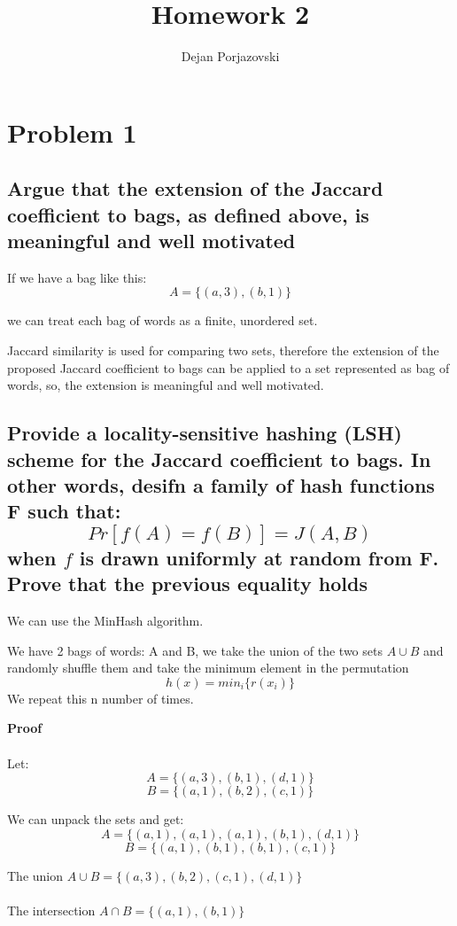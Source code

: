 \documentclass[11pt]{article}
\begin{document}
\title{\textbf{Homework 2}}
\author{Dejan Porjazovski}
\maketitle

\section{Problem 1}
\subsection{Argue that the extension of the Jaccard coefficient to bags, as defined above, is meaningful and well motivated}

If we have a bag like this:
$$ A = \{ (a,3), (b,1) \} $$

we can treat each bag of words as a finite, unordered set.

Jaccard similarity is used for comparing two sets, therefore the extension of the proposed Jaccard coefficient to bags can be applied to a set represented as bag of words, so, the extension is meaningful and well motivated.


\subsection{Provide a locality-sensitive hashing (LSH) scheme for the Jaccard coefficient to bags. In other words, desifn a family of hash functions F such that: $$ Pr[f(A) = f(B)] = J(A, B) $$
when $ f $ is drawn uniformly at random from F.
Prove that the previous equality holds
}

We can use the MinHash algorithm.

We have 2 bags of words: A and B, we take the union of the two sets $ A\cup B $ and randomly shuffle them and take the minimum element in the permutation
$$ h(x) = min_i\{ r(x_i) \} $$
We repeat this n number of times.

\textbf{Proof}
\\~\\
Let:
$$ A = \{ (a,3),(b,1), (d,1) \} $$
$$ B = \{ (a,1), (b,2), (c,1) \} $$

We can unpack the sets and get:
$$ A = \{ (a,1), (a,1), (a,1), (b,1), (d,1) \} $$
$$ B = \{ (a,1), (b,1), (b,1), (c,1) \} $$

The union $ A \cup B  = \{ (a,3), (b,2), (c,1), (d,1) \}$
\\~\\
The intersection $ A \cap B = \{ (a,1), (b,1) \} $
\end{document}
